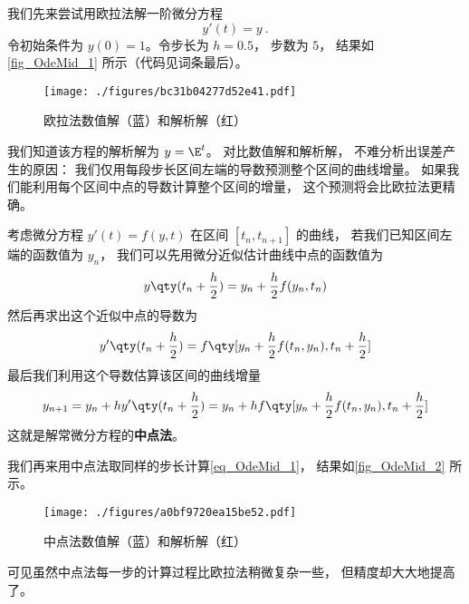 

我们先来尝试用欧拉法解一阶微分方程
\begin{equation}\label{eq_OdeMid_1}
y'(t) = y~.
\end{equation}
令初始条件为 $y(0) = 1$。令步长为 $h = 0.5$， 步数为 $5$， 结果如\autoref{fig_OdeMid_1} 所示（代码见词条最后）。

\begin{figure}[ht]
\centering
\texttt{[image: ./figures/bc31b04277d52e41.pdf]}
\caption{欧拉法数值解（蓝）和解析解（红）} \label{fig_OdeMid_1}
\end{figure}

我们知道该方程的解析解为 $y = \E^{t}$。 对比数值解和解析解， 不难分析出误差产生的原因： 我们仅用每段步长区间左端的导数预测整个区间的曲线增量。 如果我们能利用每个区间中点的导数计算整个区间的增量， 这个预测将会比欧拉法更精确。

考虑微分方程 $y'(t) = f(y, t)$ 在区间 $[t_n, t_{n+1}]$ 的曲线， 若我们已知区间左端的函数值为 $y_n$， 我们可以先用微分近似估计曲线中点的函数值为
\begin{equation}
y \qty(t_n + \frac h2) = y_n + \frac h2 f(y_n, t_n)
\end{equation}
然后再求出这个近似中点的导数为
\begin{equation}
y' \qty(t_n + \frac h2) = f \qty[y_n + \frac h2 f(t_n, y_n), t_n + \frac h2]
\end{equation}
最后我们利用这个导数估算该区间的曲线增量
\begin{equation}
y_{n+1} = y_n + hy' \qty(t_n + \frac h2) = y_n + h f \qty[y_n + \frac h2 f(t_n, y_n), t_n + \frac h2]
\end{equation}
这就是解常微分方程的\textbf{中点法}。

我们再来用中点法取同样的步长计算\autoref{eq_OdeMid_1}， 结果如\autoref{fig_OdeMid_2} 所示。

\begin{figure}[ht]
\centering
\texttt{[image: ./figures/a0bf9720ea15be52.pdf]}
\caption{中点法数值解（蓝）和解析解（红）} \label{fig_OdeMid_2}
\end{figure}

可见虽然中点法每一步的计算过程比欧拉法稍微复杂一些， 但精度却大大地提高了。 

